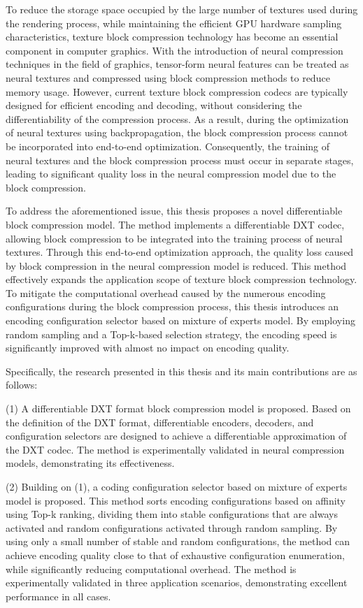 \begin{abstract*}

  To reduce the storage space occupied by the large number of textures used during the rendering process, while maintaining the efficient GPU hardware sampling characteristics, texture block compression technology has become an essential component in computer graphics. With the introduction of neural compression techniques in the field of graphics, tensor-form neural features can be treated as neural textures and compressed using block compression methods to reduce memory usage. However, current texture block compression codecs are typically designed for efficient encoding and decoding, without considering the differentiability of the compression process. As a result, during the optimization of neural textures using backpropagation, the block compression process cannot be incorporated into end-to-end optimization. Consequently, the training of neural textures and the block compression process must occur in separate stages, leading to significant quality loss in the neural compression model due to the block compression.

  To address the aforementioned issue, 
  this thesis proposes a novel differentiable block compression model. 
  The method implements a differentiable DXT codec, 
  allowing block compression to be integrated into the training process of neural textures. 
  Through this end-to-end optimization approach, 
  the quality loss caused by block compression in the neural compression model is reduced. 
  This method effectively expands the application scope of texture block compression technology. 
  To mitigate the computational overhead caused by the numerous encoding configurations during the block compression process, 
  this thesis introduces an encoding configuration selector based on mixture of experts model. 
  By employing random sampling and a Top-k-based selection strategy, 
  the encoding speed is significantly improved with almost no impact on encoding quality.

  Specifically, the research presented in this thesis and its main contributions are as follows:

  (1) A differentiable DXT format block compression model is proposed. Based on the definition of the DXT format, differentiable encoders, decoders, and configuration selectors are designed to achieve a differentiable approximation of the DXT codec. The method is experimentally validated in neural compression models, demonstrating its effectiveness.
  
  (2) Building on (1), a coding configuration selector based on mixture of experts model is proposed. This method sorts encoding configurations based on affinity using Top-k ranking, dividing them into stable configurations that are always activated and random configurations activated through random sampling. By using only a small number of stable and random configurations, the method can achieve encoding quality close to that of exhaustive configuration enumeration, while significantly reducing computational overhead. The method is experimentally validated in three application scenarios, demonstrating excellent performance in all cases.

\end{abstract*}
